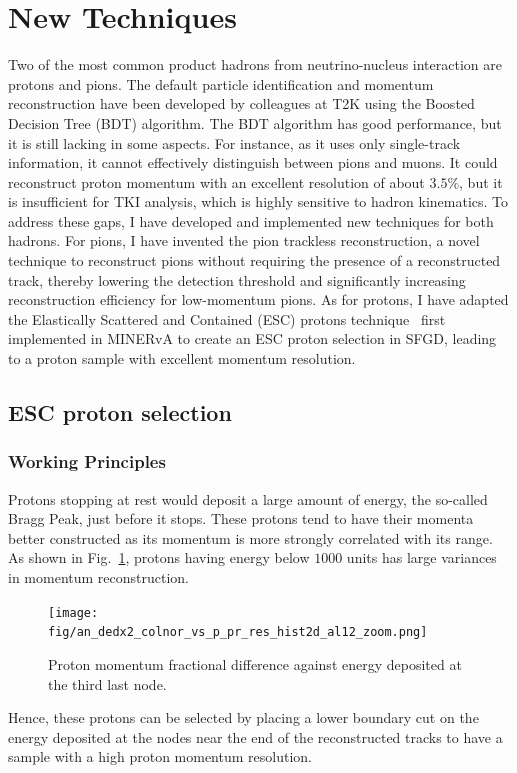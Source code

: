 \section{New Techniques}
\minitoc
   Two of the most common product hadrons from neutrino-nucleus interaction are protons and pions. 
   The default particle identification and momentum reconstruction have been developed by colleagues at T2K using the Boosted Decision Tree (BDT) algorithm. The BDT algorithm has good performance, but it is still lacking in some aspects.
   For instance, as it uses only single-track information, it cannot effectively distinguish between pions and muons. 
   It could reconstruct proton momentum with an excellent resolution of about $3.5\%$, but it is insufficient for TKI analysis, which is highly sensitive to hadron kinematics. 
   To address these gaps, I have developed and implemented new techniques for both hadrons. 
   For pions, I have invented the pion trackless reconstruction, a novel technique to reconstruct pions without requiring the presence of a reconstructed track, thereby lowering the detection threshold and significantly increasing reconstruction efficiency for low-momentum pions. 
   As for protons, I have adapted the Elastically Scattered and Contained (ESC) protons technique~\cite{Lu:2016mjf} first implemented in MINERvA to create an ESC proton selection in SFGD, leading to a proton sample with excellent momentum resolution. 

  \subsection{ESC proton selection}

    \subsubsection{Working Principles}
    Protons stopping at rest would deposit a large amount of energy, the so-called Bragg Peak, just before it stops.
    These protons tend to have their momenta better constructed as its momentum is more strongly correlated with its range. 
    As shown in Fig.~\ref{fig:andedx2}, protons having energy below $1000$ units has large variances in momentum reconstruction. 
    \begin{figure}[h]
        \centering
        \texttt{[image: fig/an\_dedx2\_colnor\_vs\_p\_pr\_res\_hist2d\_al12\_zoom.png]}
        \caption{Proton momentum fractional difference against energy deposited at the third last node.}
        \label{fig:andedx2}
    \end{figure}
    Hence, these protons can be selected by placing a lower boundary cut on the energy deposited at the nodes near the end of the reconstructed tracks to have a sample with a high proton momentum resolution.   
    
